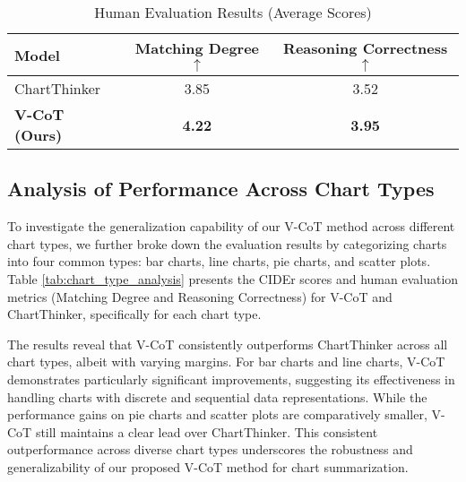\begin{table}[!t]\small
    \centering
    \caption{Human Evaluation Results (Average Scores)}
    \begin{tabular}{lcc}
        \toprule
        Model & Matching Degree $\uparrow$ & Reasoning Correctness $\uparrow$ \\
        \midrule
        ChartThinker & 3.85 & 3.52 \\
        \textbf{V-CoT (Ours)} & \textbf{4.22} & \textbf{3.95} \\
        \bottomrule
    \end{tabular}
    \label{tab:human_evaluation}
\end{table}

\subsection{Analysis of Performance Across Chart Types}

To investigate the generalization capability of our V-CoT method across different chart types, we further broke down the evaluation results by categorizing charts into four common types: bar charts, line charts, pie charts, and scatter plots. Table \ref{tab:chart_type_analysis} presents the CIDEr scores and human evaluation metrics (Matching Degree and Reasoning Correctness) for V-CoT and ChartThinker, specifically for each chart type.

The results reveal that V-CoT consistently outperforms ChartThinker across all chart types, albeit with varying margins.  For bar charts and line charts, V-CoT demonstrates particularly significant improvements, suggesting its effectiveness in handling charts with discrete and sequential data representations.  While the performance gains on pie charts and scatter plots are comparatively smaller, V-CoT still maintains a clear lead over ChartThinker. This consistent outperformance across diverse chart types underscores the robustness and generalizability of our proposed V-CoT method for chart summarization.

